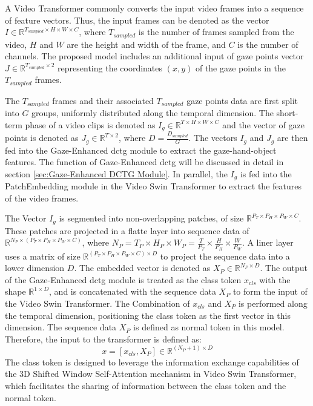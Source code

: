 A Video Transformer commonly converts the input video frames into a sequence of feature vectors. Thus, the input frames can be denoted as the vector $I \in \mathbb{R}^{T_{sampled} \times H\times W\times C}$, where $T_{sampled}$ is the number of frames sampled from the video, $H$ and $W$ are the height and width of the frame, and $C$ is the number of channels. The proposed model includes an additional input of gaze points vector $J \in \mathbb{R}^{T_{sampled} \times 2}$ representing the coordinates $(x, y)$ of the gaze points in the $T_{sampled}$ frames. 

The $T_{sampled}$ frames and their associated $T_{sampled}$ gaze points data are first split into $G$ groups, uniformly distributed along the temporal dimension. The short-term phase of a video clips is denoted as $I_{g} \in \mathbb{R}^{T \times H \times W \times C}$ and the vector of gaze points is denoted as $J_{g} \in \mathbb{R}^{T \times 2}$, where $D = \frac{D_{sampled}}{G}$. The vectors $I_{g}$ and $J_{g}$ are then fed into the Gaze-Enhanced \gls{dctg} module to extract the gaze-hand-object features. The function of Gaze-Enhanced \gls{dctg} will be discussed in detail in section \ref{sec:Gaze-Enhanced DCTG Module}. In parallel, the $I_{g}$ is fed into the PatchEmbedding module in the Video Swin Transformer to extract the features of the video frames. 

The Vector $I_{g}$ is segmented into non-overlapping patches, of size $\mathbb{R}^{P_T \times P_H \times P_W \times C}$. These patches are projected in a flatte layer into sequence data of $\mathbb{R}^{N_P \times (P_T \times P_H \times P_W \times C)}$, where $N_P = T_P \times H_P \times W_P = \frac{T}{P_T} \times \frac{H}{P_H} \times \frac{W}{P_W}$. A liner layer uses a matrix of size $\mathbb{R}^{(P_T \times P_H \times P_W \times C) \times D}$ to project the sequence data into a lower dimension $D$. The embedded vector is denoted as $X_P \in \mathbb{R}^{N_P \times D}$. The output of the Gaze-Enhanced \gls{dctg} module is treated as the class token $x_{cls}$ with the shape $\mathbb{R}^{1 \times D}$, and is concatenated with the sequence data $X_P$ to form the input of the Video Swin Transformer. The Combination of $x_{cls}$ and $X_P$ is performed along the temporal dimension, positioning the class token as the first vector in this dimension. The sequence data $X_P$ is defined as normal token in this model. Therefore, the input to the transformer is defined as:
\begin{equation}
    x= [x_{cls}, X_P] \in \mathbb{R}^{(N_P + 1) \times D}
    \label{eq:input_transformer}
\end{equation}
The class token is designed to leverage the information exchange capabilities of the 3D Shifted Window Self-Attention mechanism in Video Swin Transformer, which facilitates the sharing of information between the class token and the normal token.

